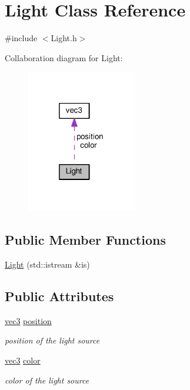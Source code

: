 \hypertarget{structLight}{}\section{Light Class Reference}
\label{structLight}


{\ttfamily \#include $<$Light.\+h$>$}



Collaboration diagram for Light\+:
\nopagebreak
\begin{figure}[H]
\begin{center}
\leavevmode
\includegraphics[width=136pt]{structLight__coll__graph}
\end{center}
\end{figure}
\subsection*{Public Member Functions}
\begin{DoxyCompactItemize}
\item 
\hyperlink{structLight_a7b5c386b586a1d3ab2a11ca60a2d6904}{Light} (std\+::istream \&is)
\end{DoxyCompactItemize}
\subsection*{Public Attributes}
\begin{DoxyCompactItemize}
\item 
\hyperlink{classvec3}{vec3} \hyperlink{structLight_a0d6a0c891a474eedc7d402352becc507}{position}
\begin{DoxyCompactList}\small\item\em position of the light source \end{DoxyCompactList}\item 
\hyperlink{classvec3}{vec3} \hyperlink{structLight_a4de55f2ffad274ae9f37045d975125a4}{color}
\begin{DoxyCompactList}\small\item\em color of the light source \end{DoxyCompactList}\end{DoxyCompactItemize}


